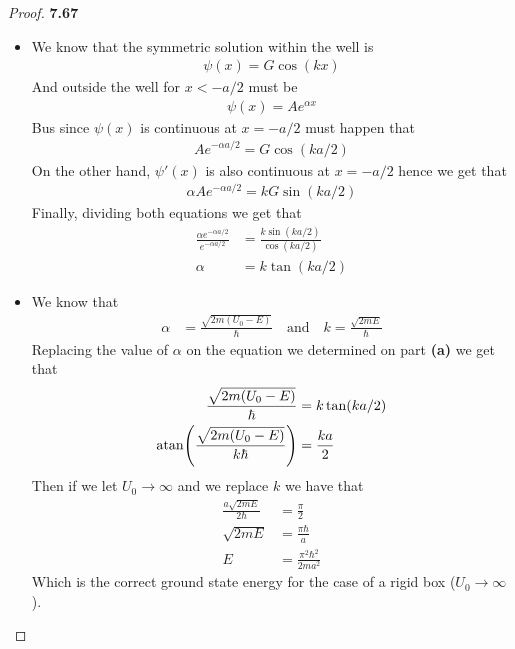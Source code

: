 \documentclass[11pt]{article}
\theoremstyle{definition}
\begin{document}
\cleardoublepage
\begin{proof}{\textbf{7.67}}
\begin{itemize}
\item [\textbf{(a)}] We know that the symmetric solution within the well is 
\begin{align*}
    \psi(x) = G\cos(kx)
\end{align*}
And outside the well for $x < -a/2$ must be
\begin{align*}
    \psi(x) = Ae^{\alpha x}
\end{align*}
Bus since $\psi(x)$ is continuous at $x = -a/2$ must happen that
\begin{align*}
    Ae^{-\alpha a/2} = G\cos(ka/2)
\end{align*}
On the other hand, $\psi'(x)$ is also continuous at $x = -a/2$ hence we get
that
\begin{align*}
    \alpha Ae^{-\alpha a/2} = kG\sin(ka/2)
\end{align*}
Finally, dividing both equations we get that
\begin{align*}
    \frac{\alpha e^{-\alpha a/2}}{e^{-\alpha a/2}}
    &= \frac{k\sin(ka/2)}{\cos(ka/2)}\\
    \alpha &= k \tan(ka/2)
\end{align*}

\item [\textbf{(b)}] We know that
\begin{align*}
    \alpha &= \frac{\sqrt{2m(U_0 - E)}}{\hbar}
    \quad\text{and}\quad
    k = \frac{\sqrt{2mE}}{\hbar}
\end{align*}
Replacing the value of $\alpha$ on the equation we determined on part
\textbf{(a)} we get that
\begin{align*}
    \frac{\sqrt{2m(U_0 - E)}}{\hbar} &= k \tan(ka/2)\\
    \atan(\frac{\sqrt{2m(U_0 - E)}}{k\hbar}) &= \frac{ka}{2}
\end{align*}
Then if we let $U_0 \to \infty$ and we replace $k$ we have that
\begin{align*}
    \frac{a\sqrt{2mE}}{2\hbar} &= \frac{\pi}{2}\\
    \sqrt{2mE} &= \frac{\pi\hbar}{a}\\
    E &= \frac{\pi^2\hbar^2}{2ma^2}
\end{align*}
Which is the correct ground state energy for the case of a rigid box
($U_0 \to \infty$).


\end{itemize}
\end{proof}
\end{document}
